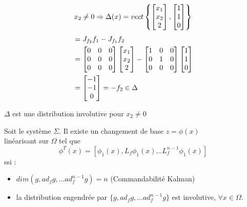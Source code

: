 \documentclass[main.tex]{subfiles}
\begin{document}
\begin{exemple}
\[ x_2 \neq 0 \Rightarrow \Delta(x) = vect\left\lbrace \begin{bmatrix} x_1 \\ x_2 \\ 2 \end{bmatrix}, \begin{bmatrix} 1 \\ 1 \\ 0 \end{bmatrix} \right\rbrace\]
\begin{align*}
[f_1,f_2] & = J_{f_2}f_1 - J_{f_1} f_2 \\
          & =
            \begin{bmatrix}
              0 & 0 & 0 \\
              0 & 0 & 0 \\
              0 & 0 & 0
            \end{bmatrix}
                      \vect{x_1 \\ x_2 \\ 2} -
          \begin{bmatrix}
              1 & 0 & 0 \\
              0 & 1 & 0 \\
              0 & 0 & 0
            \end{bmatrix}
  \vect{ 1 \\ 1 \\ 0} \\
& = \vect{ -1 \\ -1 \\ 0} = -f_2 \in \Delta
\end{align*}

$\Delta$ est une distribution involutive pour $x_2 \neq 0$
\end{exemple}

\newcommand{\lesys}{$\dot{x}=f(x)+g(x)u, x\in\R^n, u\in\R$}

\begin{thm}
  Soit le système $\Sigma$. Il existe un changement de base $z=\phi(x)$\\[1.5em]

  linéarisant  sur $\Omega$ tel que
  \[\phi^T(x) = [\phi_1(x), L_f\phi_1(x) \dots L_f^{n-1} \phi_1(x) ]\]
  ssi :
\begin{itemize}
\item $dim(g,ad_f g, \dots ad_f^{n-1} g) = n$ (Commandabilité Kalman)
\item la distribution engendrée par $\{g, ad_f g, \dots ad_f^{n-1}g\}$ est involutive, $\forall x \in \Omega$.
\end{itemize}
%   
\end{thm}
\end{document}
